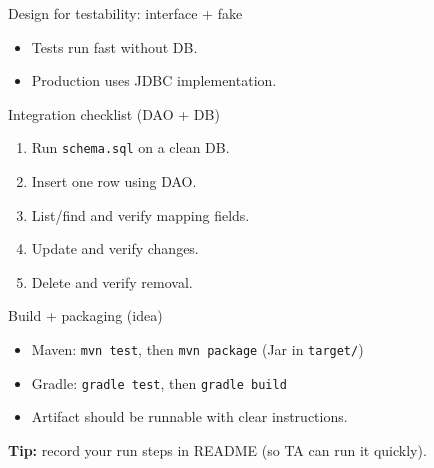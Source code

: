 \documentclass{beamer}
\begin{document}
\begin{frame}{Design for testability: interface + fake}
  \centering

  \vspace{0.6em}
  \begin{itemize}[<+->]
    \item Tests run fast without DB.
    \item Production uses JDBC implementation.
  \end{itemize}
  \slidesources{\OOPSUnitVISources}
\end{frame}

\begin{frame}{Integration checklist (DAO + DB)}
  \begin{enumerate}[<+->]
    \item Run \texttt{schema.sql} on a clean DB.
    \item Insert one row using DAO.
    \item List/find and verify mapping fields.
    \item Update and verify changes.
    \item Delete and verify removal.
  \end{enumerate}
  \slidesources{\OOPSUnitVISources}
\end{frame}

\begin{frame}{Build + packaging (idea)}
  \begin{itemize}[<+->]
    \item Maven: \texttt{mvn test}, then \texttt{mvn package} (Jar in \texttt{target/})
    \item Gradle: \texttt{gradle test}, then \texttt{gradle build}
    \item Artifact should be runnable with clear instructions.
  \end{itemize}
  \textbf{Tip:} record your run steps in README (so TA can run it quickly).
  \slidesources{\OOPSUnitVISources}
\end{frame}
\end{document}
